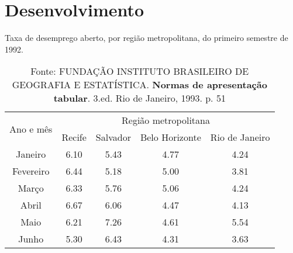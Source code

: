\chapter{Desenvolvimento}

\lipsum[1]

\begin{table}[h]
\centering
\caption{Taxa de desemprego aberto, por região metropolitana, do primeiro semestre de 1992.}
\begin{tabular}{|c|c|c|c|c|}
\hline
\multirow{2}{*}{Ano e mês} & \multicolumn{4}{|c|}{Região metropolitana}          \\ \cline{2-5} 
                           & Recife & Salvador & Belo Horizonte & Rio de Janeiro \\ \hline
Janeiro                    & 6.10   & 5.43     & 4.77           & 4.24           \\ \hline
Fevereiro                  & 6.44   & 5.18     & 5.00           & 3.81           \\ \hline
Março                      & 6.33   & 5.76     & 5.06           & 4.24           \\ \hline
Abril                      & 6.67   & 6.06     & 4.47           & 4.13           \\ \hline
Maio                       & 6.21   & 7.26     & 4.61           & 5.54           \\ \hline
Junho                      & 5.30   & 6.43     & 4.31           & 3.63           \\ \hline
\end{tabular}
\caption*{Fonte: FUNDAÇÃO INSTITUTO BRASILEIRO DE GEOGRAFIA E ESTATÍSTICA. \textbf{Normas de apresentação tabular}. 3.ed. Rio de Janeiro, 1993. p. 51}
\end{table}

\lipsum[1]